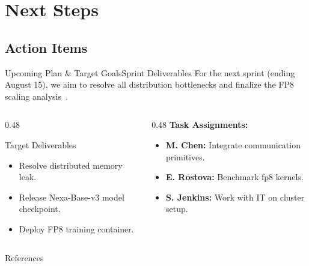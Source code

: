 \section{Next Steps}
\subsection{Action Items}

\begin{frame}{Upcoming Plan \& Target Goals}{Sprint Deliverables}
  For the next sprint (ending August 15), we aim to resolve all distribution bottlenecks and finalize the FP8 scaling analysis~\cite{chen2026dynamic}.
  
  \vspace{0.4cm}
  \begin{columns}[T]
    \begin{column}{0.48\textwidth}
      \begin{successbox}{Target Deliverables}
        \begin{itemize}
          \item Resolve distributed memory leak.
          \item Release Nexa-Base-v3 model checkpoint.
          \item Deploy FP8 training container.
        \end{itemize}
      \end{successbox}
    \end{column}
    \hfill
    \begin{column}{0.48\textwidth}
      \textbf{Task Assignments:}
      \begin{itemize}
        \item \textbf{M. Chen:} Integrate communication primitives.
        \item \textbf{E. Rostova:} Benchmark fp8 kernels.
        \item \textbf{S. Jenkins:} Work with IT on cluster setup.
      \end{itemize}
    \end{column}
  \end{columns}
\end{frame}

\begin{frame}[allowframebreaks]{References}
  \printbibliography
\end{frame}
